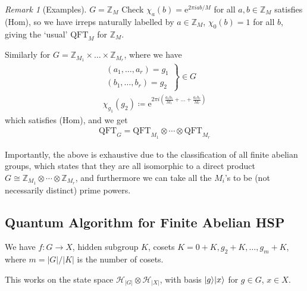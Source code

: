 \documentclass[]{article}
\DeclarePairedDelimiter\ket{\lvert}{\rangle}
\theoremstyle{custhm}
\theoremstyle{cusdef}
\theoremstyle{custhm}
\theoremstyle{custhm}
\theoremstyle{custhm}
\theoremstyle{custhm}
\theoremstyle{cusdef}
\theoremstyle{remark}
\newtheorem*{remark*}{Remark}
\newcommand{\Z}{\mathbb{Z}}
\newcommand{\e}{\mathrm{e}}
\newcommand{\ra}{\rightarrow}
\newcommand{\qft}{\textrm{QFT}}
\begin{document}
\begin{remark*}[Examples] $G = \Z_M$
Check $\chi_a(b) = \e^{2\pi i ab/M}$ for all $a,b\in \Z_M$ satisfies (Hom), so we have irreps naturally labelled by $a\in \Z_M$, $\chi_0(b) = 1$ for all $b$, giving the `usual' $\qft_M$ for $\Z_M$.

Similarly for $G = \Z_{M_1}\times\dots\times\Z_{M_r}$, where we have
\begin{align*}
\left.\begin{array}{c} (a_1,\dots,a_r) = g_1 \\ (b_1,\dots,b_r) = g_2\end{array}\right\rbrace \in G\\
\chi_{g_1}(g_2) \coloneqq \e^{2\pi i\left( \frac{a_1b_1}{M_1}+\dots+\frac{a_rb_r}{M_r}  \right)}
\end{align*}
which satisfies (Hom), and we get
\begin{align*}
\qft_G = \qft_{M_1}\otimes \cdots \otimes \qft_{M_r}
\end{align*}
\end{remark*}

Importantly, the above is exhaustive due to the classification of all finite abelian groups, which states that they are all isomorphic to a direct product $G\cong \Z_{M_1}\otimes\cdots\otimes\Z_{M_r}$, and furthermore we can take all the $M_i$'s to be (not necessarily distinct) prime powers. 

\subsection*{Quantum Algorithm for Finite Abelian HSP}

We have $f: G\ra X$, hidden subgroup $K$, cosets $K = 0 + K, g_2 + K,\dots,g_m+ K$, where $m = |G|/|K|$ is the number of cosets.

This works on the state space $\mathcal{H}_{|G|}\otimes\mathcal{H}_{|X|}$, with basis $\ket{g}\ket{x}$ for $g\in G$, $x\in X$.
\end{document}
